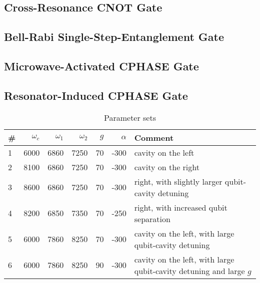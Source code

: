 \subsection{Cross-Resonance CNOT Gate}
\cite{ChowPRL2011}

\subsection{Bell-Rabi Single-Step-Entanglement Gate}
\cite{PolettoPRL2012}

\subsection{Microwave-Activated CPHASE Gate}
\cite{ChowNJP2013}

\subsection{Resonator-Induced CPHASE Gate}


\begin{table}[htbp]
  \centering
  \begin{tabular}{lrrrrrl}
  \toprule
  \#  &  {$\omega_c$} & {$\omega_1$} & {$\omega_2$} & {$g$} & {$\alpha$} & Comment\\
  \midrule
  1   &  6000         & 6860         & 7250         & 70    & -300       & cavity on the left \\
  2   &  8100         & 6860         & 7250         & 70    & -300       & cavity on the right \\
  3   &  8600         & 6860         & 7250         & 70    & -300       & right, with slightly larger qubit-cavity detuning\\
  4   &  8200         & 6850         & 7350         & 70    & -250       & right, with increased qubit separation \\
  5   &  6000         & 7860         & 8250         & 70    & -300       & cavity on the left, with large qubit-cavity detuning\\
  6   &  6000         & 7860         & 8250         & 90    & -300       & cavity on the left, with large qubit-cavity detuning and large $g$\\
  \bottomrule
  \end{tabular}
  \caption{Parameter sets}
  \label{tab:RIP_entang_params}
\end{table}

